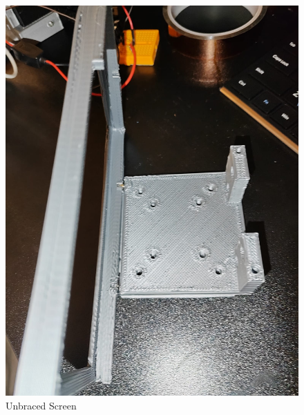 \begin{figure}[t]
  \begin{minipage}[t]{0.24\textwidth}
    \centering
    \includegraphics[width=\textwidth]{imgs/design/unbracedscreen.jpeg}
    \caption{Unbraced Screen}
    \label{fig:unbracedscreen}
  \end{minipage}
  \hfill
  \begin{minipage}[t]{0.24\textwidth}
    \centering

\end{minipage}
\end{figure}
